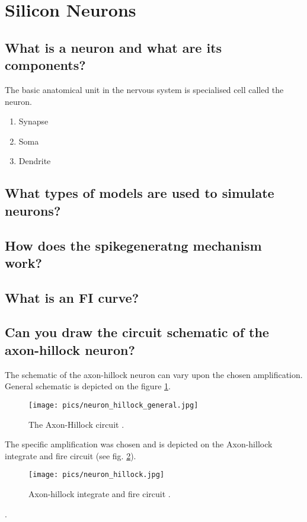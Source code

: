 \documentclass[report]{subfiles}
\begin{document}
\section{Silicon Neurons}
\subsection{What is a neuron and what are its components?}
The basic anatomical unit in the nervous system is specialised cell called the neuron.

\cite{book:Mead}

\begin{enumerate}
\item Synapse
\item Soma
\item Dendrite
\end{enumerate}
\subsection{What types of models are used to simulate neurons?}
\subsection{How does the spikegeneratng mechanism work?}
\subsection{What is an FI curve?}
\subsection{Can you draw the circuit schematic of the axon-hillock neuron?}
The schematic of the axon-hillock neuron can vary upon the chosen amplification. General schematic is depicted on the figure \ref{fig:neuron_hillock_general}.

\begin{figure}[htbp]
  \centering
  \texttt{[image: pics/neuron\_hillock\_general.jpg]}
  \caption{The Axon-Hillock circuit \cite{lecture11}.}
  \label{fig:neuron_hillock_general}
\end{figure} 

The specific amplification was chosen and is depicted on the Axon-hillock integrate and fire circuit (see fig. \ref{fig:neuron_hillock}).

\begin{figure}[htbp]
  \centering
  \texttt{[image: pics/neuron\_hillock.jpg]}
  \caption{Axon-hillock integrate and fire circuit \cite{lab11}.}
  \label{fig:neuron_hillock}
\end{figure} 


\cite{lab11}.
\end{document}
